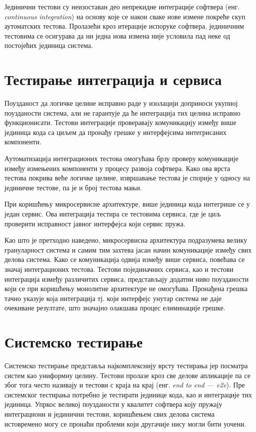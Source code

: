\documentclass[12pt,oneside]{memoir}
\begin{document}
Јединични тестови су неизоставан део непрекидне интеграције софтвера (енг. \textit{continuous integration}) на основу које се након сваке нове измене покреће скуп аутоматских тестова. Пролазећи кроз итерације испоруке софтвера, јединичним тестовима се осигурава да ни једна нова измена није условила пад неке од постојећих јединица система.

\section{Тестирање интеграција и сервиса}

Поузданост да логичке целине исправно раде у изолацији доприноси укупној поузданости система, али не гарантује да ће интеграција тих целина исправно функционисати. Тестови интеграције проверавају комуникацију између више јединица кода са циљем да пронађу грешке у интерфејсима интегрисаних компоненти.

Аутоматизација интеграционих тестова омогућава брзу проверу комуникације између измењених компоненти у процесу развоја софтвера. Како ова врста тестова покрива веће логичке целине, извршавање тестова је спорије у односу на јединичне тестове, па је и број тестова мањи. 

При коришћењу микросервисне архитектуре, више јединица кода интегрише се у један сервис. Ова интеграција тестира се тестовима сервиса, где је циљ проверити исправност јавног интерфејса који сервис пружа. 

Као што је претходно наведено, микросервисна архитектура подразумева велику грануларност система и самим тим захтева јасан начин комуникације између свих делова система. Како се комуникација одвија између више сервиса, повећава се значај интеграционих тестова. Тестови појединачних сервиса, као и тестови интеграција између различитих сервиса, представљају додатни ниво поузданости који се при коришћењу монолитне архитектуре не омогућава. Пронађена грешка тачно указује која интеграција тј. који интерфејс унутар система не даје очекиване резултате, што значајно олакшава процес елиминације грешке.


\section{Системско тестирање}

Системско тестирање представља најкомплекснију врсту тестирања јер посматра систем као униформну целину. Тестови пролазе кроз све делове апликације па се због тога често називају и тестови с краја на крај (енг.\textit{ end to end --- e2e}). Пре системског тестирања потребно је тестирати јединице кода, као и интеграције тих јединица. Упркос великој поузданости у квалитет софтвера коју пружају интеграциони и јединични тестови, коришћењем свих делова система истовремено могу се пронаћи проблеми који другачије нису могли бити уочени.
\end{document}
